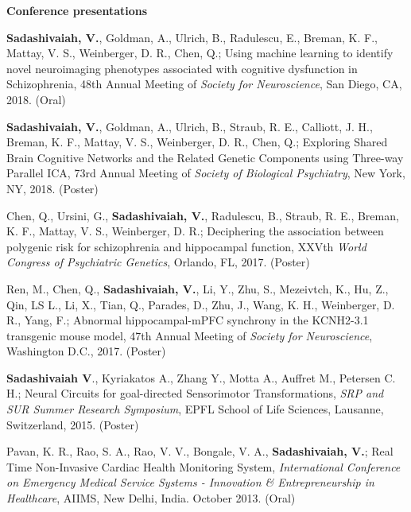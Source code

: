 \documentclass{resume}
\begin{document}
\textbf{\large Conference presentations}
\begin{presentations}
\item \textbf{Sadashivaiah, V.}, Goldman, A., Ulrich, B., Radulescu, E., Breman, K. F., Mattay, V. S., Weinberger, D. R., Chen, Q.; Using machine learning to identify novel neuroimaging phenotypes associated with cognitive dysfunction in Schizophrenia, 48th Annual Meeting of \textit{Society for Neuroscience}, San Diego, CA, 2018. (Oral)

\item \textbf{Sadashivaiah, V.}, Goldman, A., Ulrich, B., Straub, R. E., Calliott, J. H., Breman, K. F., Mattay, V. S., Weinberger, D. R., Chen, Q.; Exploring Shared Brain Cognitive Networks and the Related Genetic Components using Three-way Parallel ICA, 73rd Annual Meeting of \textit{Society of Biological Psychiatry}, New York, NY, 2018. (Poster) 

\item Chen, Q., Ursini, G., \textbf{Sadashivaiah, V.}, Radulescu, B., Straub, R. E., Breman, K. F., Mattay, V. S., Weinberger, D. R.; Deciphering the association between polygenic risk for schizophrenia and hippocampal function, XXVth \textit{World Congress of Psychiatric Genetics}, Orlando, FL, 2017. (Poster)

\item Ren, M., Chen, Q., \textbf{Sadashivaiah, V.}, Li, Y., Zhu, S., Mezeivtch, K., Hu, Z.,  Qin, LS L., Li, X., Tian, Q., Parades, D., Zhu, J., Wang, K. H., Weinberger, D. R., Yang, F.; Abnormal hippocampal-mPFC synchrony in the KCNH2-3.1 transgenic mouse model, 47th Annual Meeting of \textit{Society for Neuroscience}, Washington D.C., 2017. (Poster)

\item \textbf{Sadashivaiah V}.,  Kyriakatos A.,  Zhang Y.,  Motta A.,  Auffret M.,  Petersen C. H.; Neural Circuits for goal-directed Sensorimotor Transformations, \textit{SRP and SUR Summer Research Symposium}, EPFL School of Life Sciences, Lausanne, Switzerland, 2015. (Poster)

\item Pavan, K. R., Rao, S. A., Rao, V. V., Bongale, V. A., \textbf{Sadashivaiah, V.}; Real Time Non-Invasive Cardiac Health Monitoring System,  \textit{International Conference on Emergency Medical Service Systems - Innovation \& Entrepreneurship in Healthcare}, AIIMS, New Delhi, India. October 2013. (Oral)
\end{presentations}

\vspace{1em}
\end{document}
